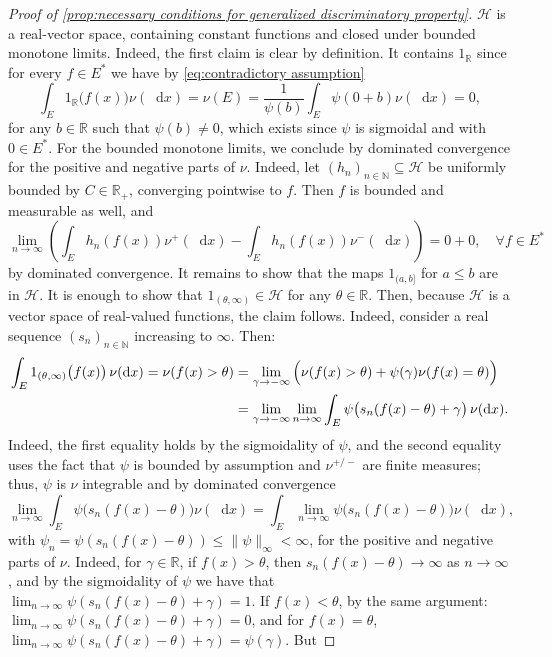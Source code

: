 \documentclass[11pt,a4paper,twoside,openany]{report}
\numberwithin{equation}{section}
\newcommand{\diff}{\mathop{}\!\mathrm{d}}
\theoremstyle{plain} %
\theoremstyle{definition} %
\theoremstyle{remark} %
\begin{document}
\begin{proof}[Proof of \ref{prop:necessary conditions for generalized discriminatory property}]
    
    \(\mathcal{H}\) is a real-vector space, containing constant functions and closed under  bounded monotone limits. Indeed, the first claim is clear by definition. It contains \(1_{\mathbb{R}}\) since for every \(f\in E^*\) we have by \eqref{eq:contradictory assumption}
    \begin{equation*}
        \int_E1_{\mathbb{R}}\big(f(x)\big)\nu(\diff x)=\nu(E)=\frac{1}{\psi(b)}\int_E\psi(0+b)\nu(\diff x)=0,
    \end{equation*}
    for any \(b\in\mathbb{R}\) such that \(\psi(b)\neq 0\), which exists since \(\psi\) is sigmoidal and with \(0\in E^*\).
    For the bounded monotone limits, we conclude by dominated convergence for the positive and negative parts of \(\nu\). Indeed, let \((h_n)_{n\in\mathbb{N}}\subseteq \mathcal{H}\) be uniformly bounded by \(C\in\mathbb{R}_+\), converging pointwise to \(f\). Then \(f\) is bounded and measurable as well, and 
    \begin{equation*}
        \lim_{n\to\infty}\left(\int_Eh_n(f(x))\nu^+(\diff x)-\int_Eh_n(f(x))\nu^-(\diff x)\right)=0+0,\quad\forall f\in E^*
    \end{equation*}
    by dominated convergence. It remains to show that the maps \(1_{(a,b]}\) for \(a\leq b\) are in \(\mathcal{H}\). It is enough to show that \(1_{(\theta,\infty)}\in\mathcal{H}\) for any \(\theta\in\mathbb{R}\). Then, because \(\mathcal{H}\) is a vector space of real-valued functions, the claim follows. Indeed, consider a real sequence \((s_n)_{n\in\mathbb{N}}\) increasing to \(\infty\). Then:
    \begin{align*}
\int_E 1_{(\theta,\infty)}\big(f(x)\big)\,\nu(\diff x)=\nu(f(x)>\theta)
&=\lim_{\gamma\to-\infty}\Big(\nu(f(x)>\theta)+\psi(\gamma)\nu(f(x)=\theta)\Big)\notag\\
&=\lim_{\gamma\to-\infty}\lim_{n\to\infty}\int_E\psi\big(s_n(f(x)-\theta)+\gamma\big)\,\nu(\diff x).
\end{align*}
    Indeed, the first equality holds by the sigmoidality of \(\psi\), and the second equality uses the fact that \(\psi\) is bounded by assumption and \(\nu^{+/-}\) are finite measures; thus, \(\psi\) is \(\nu\) integrable and by dominated convergence 
    \begin{equation*}
        \lim_{n\to\infty}\int_E\psi\big(s_n(f(x)-\theta)\big)\nu(\diff x)=\int_E\lim_{n\to\infty}\psi\big(s_n(f(x)-\theta)\big)\nu(\diff x),
        \end{equation*}
        with \(\psi_n=\psi(s_n(f(x)-\theta))\leq\lVert \psi\rVert_{\infty}<\infty\),  for the positive and negative parts of \(\nu\). Indeed, for \(\gamma\in\mathbb{R}\), if \(f(x)>\theta\), then \(s_n(f(x)-\theta)\to\infty\) as \(n\to\infty\), and by the sigmoidality of \(\psi\) we have that \(\lim_{n\to\infty}\psi(s_n(f(x)-\theta)+\gamma)=1\). If \(f(x)<\theta\), by the same argument: \(\lim_{n\to\infty}\psi(s_n(f(x)-\theta)+\gamma)=0\), and for \(f(x)=\theta\), \(\lim_{n\to\infty}\psi(s_n(f(x)-\theta)+\gamma)=\psi(\gamma)\). But

\end{proof}
\end{document}
